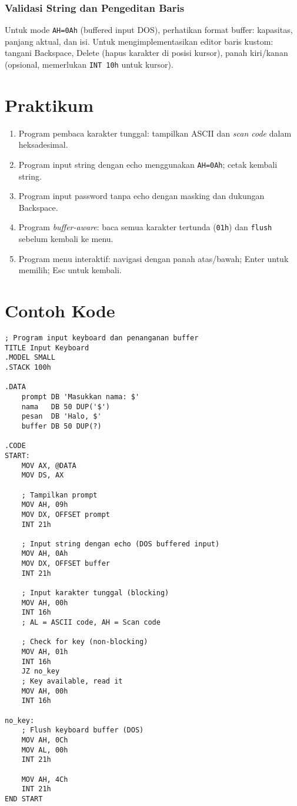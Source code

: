 \subsubsection{Validasi String dan Pengeditan Baris}
Untuk mode \texttt{AH=0Ah} (buffered input DOS), perhatikan format buffer: kapasitas, panjang aktual, dan isi. Untuk mengimplementasikan editor baris kustom: tangani Backspace, Delete (hapus karakter di posisi kursor), panah kiri/kanan (opsional, memerlukan \texttt{INT 10h} untuk kursor). \cite{dosbox_manual}


\section{Praktikum}
\begin{enumerate}
  \item Program pembaca karakter tunggal: tampilkan ASCII dan \textit{scan code} dalam heksadesimal.
  \item Program input string dengan echo menggunakan \texttt{AH=0Ah}; cetak kembali string.
  \item Program input password tanpa echo dengan masking dan dukungan Backspace.
  \item Program \textit{buffer-aware}: baca semua karakter tertunda (\texttt{01h}) dan \texttt{flush} sebelum kembali ke menu.
  \item Program menu interaktif: navigasi dengan panah atas/bawah; Enter untuk memilih; Esc untuk kembali.
\end{enumerate}

\section{Contoh Kode}
\begin{verbatim}
; Program input keyboard dan penanganan buffer
TITLE Input Keyboard
.MODEL SMALL
.STACK 100h

.DATA
    prompt DB 'Masukkan nama: $'
    nama   DB 50 DUP('$')
    pesan  DB 'Halo, $'
    buffer DB 50 DUP(?)

.CODE
START:
    MOV AX, @DATA
    MOV DS, AX
    
    ; Tampilkan prompt
    MOV AH, 09h
    MOV DX, OFFSET prompt
    INT 21h
    
    ; Input string dengan echo (DOS buffered input)
    MOV AH, 0Ah
    MOV DX, OFFSET buffer
    INT 21h
    
    ; Input karakter tunggal (blocking)
    MOV AH, 00h
    INT 16h
    ; AL = ASCII code, AH = Scan code
    
    ; Check for key (non-blocking)
    MOV AH, 01h
    INT 16h
    JZ no_key
    ; Key available, read it
    MOV AH, 00h
    INT 16h
    
no_key:
    ; Flush keyboard buffer (DOS)
    MOV AH, 0Ch
    MOV AL, 00h
    INT 21h
    
    MOV AH, 4Ch
    INT 21h
END START
\end{verbatim}

